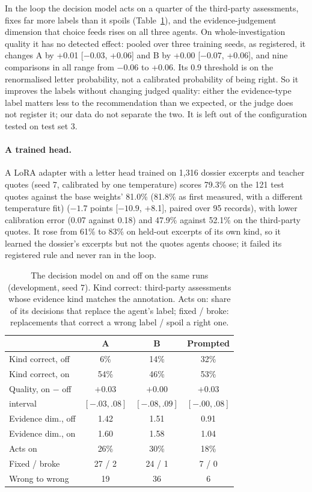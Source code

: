 \documentclass[11pt]{article}
\begin{document}
In the loop the decision model acts on a quarter of the third-party assessments, fixes far more labels than it
spoils (Table~\ref{tab:decide}), and the evidence-judgement dimension that choice feeds rises on all three agents. On
whole-investigation quality it has no detected effect: pooled over three training seeds, as registered, it
changes A by +0.01 [$-0.03$, +0.06] and B by +0.00 [$-0.07$, +0.06], and nine comparisons in all range from $-0.06$
to +0.06.
Its 0.9 threshold is on the renormalised letter probability, not a calibrated probability of being right. So it
improves the labels without changing judged quality: either the evidence-type label matters less to the
recommendation than we expected, or the judge does not register it; our data do not separate the two. It is left out
of the configuration tested on test set 3.

\paragraph{A trained head.} A LoRA adapter with a letter head trained on 1,316 dossier excerpts and teacher quotes
(seed 7, calibrated by one temperature) scores 79.3\% on the 121 test quotes against the base weights' 81.0\% (81.8\% as first measured, with a different temperature fit)
($-1.7$ points [$-10.9$, +8.1], paired over 95 records), with lower calibration error (0.07 against 0.18) and 47.9\%
against 52.1\% on the third-party quotes. It rose from 61\% to 83\% on held-out excerpts of its own kind, so it
learned the dossier's excerpts but not the quotes agents choose; it failed its registered rule and never ran in the
loop.

\begin{table}[h]
\centering
\small
\setlength{\tabcolsep}{4pt}
\begin{tabular}{lccc}
\toprule
 & A & B & Prompted \\
\midrule
Kind correct, off & 6\% & 14\% & 32\% \\
Kind correct, on & 54\% & 46\% & 53\% \\
Quality, on $-$ off & $+0.03$ & $+0.00$ & $+0.03$ \\
\quad interval & {\scriptsize $[-.03, .08]$} & {\scriptsize $[-.08, .09]$} & {\scriptsize $[-.00, .08]$} \\
Evidence dim., off & 1.42 & 1.51 & 0.91 \\
Evidence dim., on & 1.60 & 1.58 & 1.04 \\
\midrule
Acts on & 26\% & 30\% & 18\% \\
Fixed / broke & 27 / 2 & 24 / 1 & 7 / 0 \\
Wrong to wrong & 19 & 36 & 6 \\
\bottomrule
\end{tabular}
\caption{The decision model on and off on the same runs (development, seed 7). Kind correct: third-party
assessments whose evidence kind matches the annotation. Acts on: share of its decisions that replace the agent's
label; fixed / broke: replacements that correct a wrong label / spoil a right one.}
\label{tab:decide}
\end{table}
\end{document}
